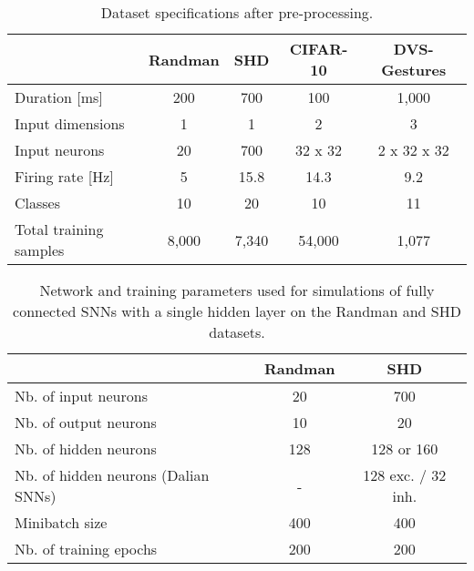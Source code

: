 \documentclass[11pt,a4paper]{article}
\begin{document}
\begin{refsection}
\begin{table}[tpbh]
\setlength{\tabcolsep}{5pt}
\centering
\begin{tabular*}{\textwidth}{@{\extracolsep{\fill}}lcccc}
\hline
 	            					    & Randman 	& SHD 		& CIFAR-10 		& DVS-Gestures 	\\
\hline 
 Duration  [ms]   	& 200		& 700		& 100			& 1,000			\\
 Input dimensions		                & 1			& 1			& 2				& 3				\\
 Input neurons 	    & 20		& 700		& 32 x 32		& 2 x 32 x 32	\\
 Firing rate  [Hz]  & 5         & 15.8      & 14.3          & 9.2           \\
 Classes		                        & 10		& 20		& 10			& 11			\\
 Total training samples	                & 8,000		& 7,340		& 54,000		& 1,077			\\
\hline
\end{tabular*}
\caption{Dataset specifications after pre-processing.}
\label{stab:datasets}
\end{table}



\begin{table}[htpb]
\setlength{\tabcolsep}{5pt}
\centering
\begin{tabular*}{\textwidth}{@{\extracolsep{\fill}}lcc}
\toprule
 								        & Randman		                    & SHD 		\\
\midrule 
Nb. of input neurons			        & 20				                    & 700		\\
Nb. of output neurons			    & 10				                    	& 20			\\
Nb. of hidden neurons			    & 128                      			& 128 or 160		\\
Nb. of hidden neurons (Dalian \acp{SNN})		& -		        				& 128 exc. / 32 inh.			\\
Minibatch size					        & 400                   				& 400			\\
Nb. of training epochs				    & 200	                    		& 200			\\
\bottomrule
\end{tabular*}
\caption{Network and training parameters used for simulations of fully connected \acp{SNN} with a single hidden layer on the Randman and SHD datasets.}
\label{stab:architecture_shallow}
\end{table}




\end{refsection}
\end{document}
